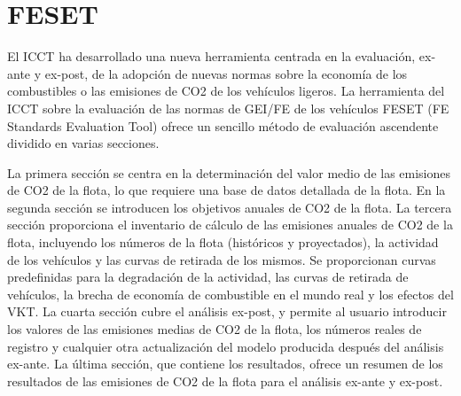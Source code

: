 \section{FESET}

El ICCT ha desarrollado una nueva herramienta centrada en la evaluación, ex-ante y ex-post, de la adopción de nuevas normas sobre la economía de los combustibles o las emisiones de CO2 de los vehículos ligeros. La herramienta del ICCT sobre la evaluación de las normas de GEI/FE de los vehículos FESET (FE Standards Evaluation Tool) ofrece un sencillo método de evaluación ascendente dividido en varias secciones.

La primera sección se centra en la determinación del valor medio de las emisiones de CO2 de la flota, lo que requiere una base de datos detallada de la flota. En la segunda sección se introducen los objetivos anuales de CO2 de la flota. La tercera sección proporciona el inventario de cálculo de las emisiones anuales de CO2 de la flota, incluyendo los números de la flota (históricos y proyectados), la actividad de los vehículos y las curvas de retirada de los mismos. Se proporcionan curvas predefinidas para la degradación de la actividad, las curvas de retirada de vehículos, la brecha de economía de combustible en el mundo real y los efectos del VKT. La cuarta sección cubre el análisis ex-post, y permite al usuario introducir los valores de las emisiones medias de CO2 de la flota, los números reales de registro y cualquier otra actualización del modelo producida después del análisis ex-ante. La última sección, que contiene los resultados, ofrece un resumen de los resultados de las emisiones de CO2 de la flota para el análisis ex-ante y ex-post. 